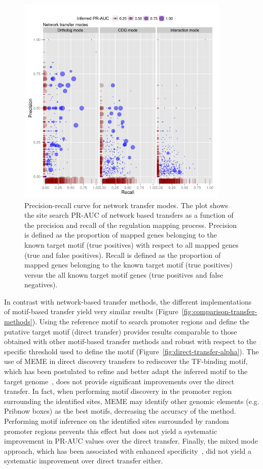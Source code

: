 \begin{figure}
  \centering
  \includegraphics[width=0.9\textwidth]{figures/chapter3/network-transfer-auc}
  \caption{Precision-recall curve for network transfer modes. The plot shows
    the site search PR-AUC of network based transfers as a function of the
    precision and recall of the regulation mapping process. Precision is
    defined as the proportion of mapped genes belonging to the known target
    motif (true positives) with respect to all mapped genes (true and false
    positives). Recall is defined as the proportion of mapped genes belonging
    to the known target motif (true positives) versus the all known target
    motif genes (true positives and false negatives).}
\label{fig:network-transfer-auc}
\end{figure}

In contrast with network-based transfer methods, the different implementations
of motif-based transfer yield very similar results
(Figure~\ref{fig:comparison-transfer-methods}). Using the reference motif to
search promoter regions and define the putative target motif (direct transfer)
provides results comparable to those obtained with other motif-based transfer
methods and robust with respect to the specific threshold used to define the
motif (Figure~\ref{fig:direct-transfer-alpha}). The use of MEME in direct
discovery transfers to rediscover the TF-binding motif, which has been
postulated to refine and better adapt the inferred motif to the target
genome~\cite{habib2012functional}, does not provide significant improvements
over the direct transfer. In fact, when performing motif discovery in the
promoter region surrounding the identified sites, MEME may identify other
genomic elements (e.g. Pribnow boxes) as the best motifs, decreasing the
accuracy of the method. Performing motif inference on the identified sites
surrounded by random promoter regions prevents this effect but does not yield a
systematic improvement in PR-AUC values over the direct transfer. Finally, the
mixed mode approach, which has been associated with enhanced
specificity~\cite{baumbach2010power, baumbach2009reliable}, did not yield a
systematic improvement over direct transfer either.


